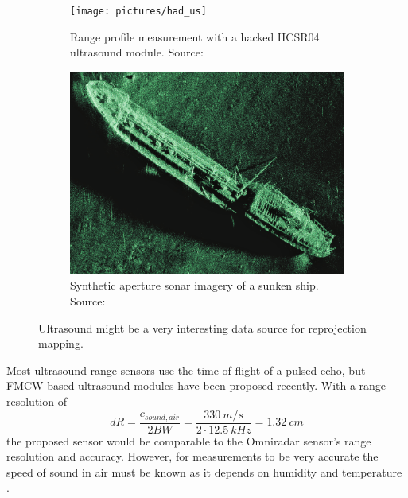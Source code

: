 \begin{figure}[htpp]
    \begin{subfigure}[t]{0.38893201425\textwidth}
        \centering
        \texttt{[image: pictures/had\_us]}
        \caption{Range profile measurement with a hacked HCSR04 ultrasound module. Source: \cite{Lee2015}}
        \label{fig:had_us}
    \end{subfigure}%
    \hfill%
    \begin{subfigure}[t]{0.56106798574\textwidth}
        \centering
        \includegraphics[max width=\linewidth]{gfx/pictures/sonar_sar}
        \caption{Synthetic aperture sonar imagery of a sunken ship. Source: \cite{Hansen2011}}
        \label{fig:sonar}
    \end{subfigure}
    \caption{Ultrasound might be a very interesting data source for reprojection mapping.}
    \label{fig:us}
\end{figure}

Most ultrasound range sensors use the time of flight of a pulsed echo,
but FMCW-based ultrasound modules have been proposed
\cite{Battaglini2014} recently. With a range resolution of
\begin{equation}
    dR = \frac{c_{sound, air}}{2 BW} = \frac{\SI{330}{m\per s}}{2\cdot \SI{12.5}{kHz}} = \SI{1.32}{cm}
\end{equation}
the proposed sensor would be comparable to the Omniradar sensor's range
resolution and accuracy. However, for measurements to be very accurate
the speed of sound in air must be known as it depends on humidity and
temperature \cite{Bohn1987}.

